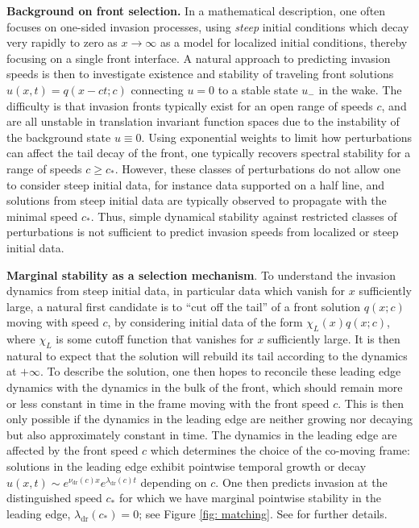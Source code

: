 \documentclass[11pt]{article}
\numberwithin{equation}{section}
\numberwithin{prop}{section}
\begin{document}
\noindent \textbf{Background on front selection.} In a mathematical description, one often focuses on one-sided invasion processes, using \emph{steep} initial conditions which decay very rapidly to zero as $x \to \infty$ as a model for localized initial conditions, thereby focusing on a single front interface. A natural approach to predicting invasion speeds is then to investigate existence and stability of traveling front solutions $u(x,t) = q(x-ct;c)$ connecting $u = 0$ to a stable state $u_-$ in the wake. The difficulty is that invasion fronts typically exist for an open range of speeds $c$, and are all unstable in translation invariant function spaces due to the instability of the background state $u \equiv 0$. Using exponential weights to limit how perturbations can affect the tail decay of the front, one typically recovers spectral stability for a range of speeds $c \geq c_*$. However, these classes of perturbations do not allow one to consider steep initial data, for instance data supported on a half line, and solutions from steep initial data are typically observed to propagate with the minimal speed $c_*$. Thus, simple dynamical stability against restricted classes of perturbations is not sufficient to predict invasion speeds from localized or steep initial data.  

\noindent \textbf{Marginal stability as a selection mechanism}. To understand the invasion dynamics from steep initial data, in particular data which vanish for $x$ sufficiently large, a natural first candidate is to ``cut off the tail'' of a front solution $q(x;c)$ moving with speed $c$, by considering initial data of the form $\chi_L (x) q(x;c)$, where $\chi_L$ is some cutoff function that vanishes for $x$ sufficiently large. It is then natural to expect that the solution will rebuild its tail according to the dynamics at $+\infty$. To describe the solution, one then hopes to reconcile these leading edge dynamics with the dynamics in the bulk of the front, which should remain more or less constant in time in the frame moving with the front speed $c$. This is then only possible if the dynamics in the leading edge are neither growing nor decaying but also approximately constant in time. The dynamics in the leading edge are affected by the front speed $c$ which determines the choice of the co-moving frame: solutions in the leading edge exhibit pointwise temporal growth or decay $u(x,t) \sim e^{\nu_\mathrm{dr}(c) x} e^{ \lambda_\mathrm{dr} (c) t}$ depending on $c$. One then predicts invasion at the distinguished speed $c_*$ for which we have marginal pointwise stability in the leading edge, $\lambda_\mathrm{dr}(c_*) = 0$; see Figure \ref{fig: matching}. See \cite{CAMS, vanSaarloosReview, colleteckmann} for further details. 
\end{document}
